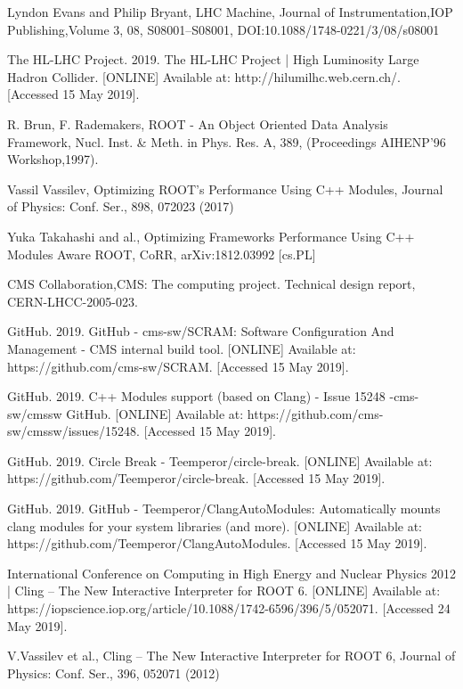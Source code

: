 \documentclass[12pt]{iopart}
\begin{document}
\begin{thebibliography}{10}

Lyndon Evans and Philip Bryant, LHC Machine, Journal of Instrumentation,IOP Publishing,Volume 3, 08, S08001--S08001, DOI:10.1088/1748-0221/3/08/s08001

The HL-LHC Project. 2019. The HL-LHC Project | High Luminosity Large Hadron Collider. [ONLINE] Available at: http://hilumilhc.web.cern.ch/. [Accessed 15 May 2019]. 

R. Brun, F. Rademakers, ROOT - An Object Oriented Data Analysis Framework, Nucl. Inst. \& Meth. in Phys. Res. A, 389, (Proceedings AIHENP'96 Workshop,1997).

Vassil Vassilev, Optimizing ROOT's Performance Using C++ Modules, Journal of Physics: Conf. Ser., 898, 072023 (2017)

Yuka Takahashi and al., Optimizing Frameworks Performance Using C++ Modules Aware ROOT, CoRR, arXiv:1812.03992 [cs.PL]

CMS Collaboration,CMS: The computing project. Technical design report, CERN-LHCC-2005-023.

GitHub. 2019. GitHub - cms-sw/SCRAM: Software Configuration And Management - CMS internal build tool. [ONLINE] Available at: https://github.com/cms-sw/SCRAM. [Accessed 15 May 2019].

GitHub. 2019. C++ Modules support (based on Clang) - Issue 15248 -cms-sw/cmssw GitHub. [ONLINE] Available at: https://github.com/cms-sw/cmssw/issues/15248. [Accessed 15 May 2019]. 

GitHub. 2019. Circle Break - Teemperor/circle-break. [ONLINE] Available at: https://github.com/Teemperor/circle-break. [Accessed 15 May 2019]. 

GitHub. 2019. GitHub - Teemperor/ClangAutoModules: Automatically mounts clang modules for your system libraries (and more). [ONLINE] Available at: https://github.com/Teemperor/ClangAutoModules. [Accessed 15 May 2019]. 

International Conference on Computing in High Energy and Nuclear Physics 2012 | Cling – The New Interactive Interpreter for ROOT 6. [ONLINE] Available at: https://iopscience.iop.org/article/10.1088/1742-6596/396/5/052071. [Accessed 24 May 2019]. 

V.Vassilev et al., Cling – The New Interactive Interpreter for ROOT 6, Journal of Physics: Conf. Ser., 396, 052071 (2012)

\end{thebibliography}
\end{document}
